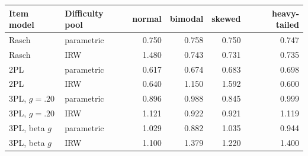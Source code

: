 \begin{tabular}{llrrrr}
\hline
Item model & Difficulty pool & normal & bimodal & skewed & heavy-tailed \\
\hline
Rasch & parametric & 0.750 & 0.758 & 0.750 & 0.747 \\
Rasch & IRW & 1.480 & 0.743 & 0.731 & 0.735 \\
2PL & parametric & 0.617 & 0.674 & 0.683 & 0.698 \\
2PL & IRW & 0.640 & 1.150 & 1.592 & 0.600 \\
3PL, $g=.20$ & parametric & 0.896 & 0.988 & 0.845 & 0.999 \\
3PL, $g=.20$ & IRW & 1.121 & 0.922 & 0.921 & 1.119 \\
3PL, beta $g$ & parametric & 1.029 & 0.882 & 1.035 & 0.944 \\
3PL, beta $g$ & IRW & 1.100 & 1.379 & 1.220 & 1.400 \\
\hline
\end{tabular}
